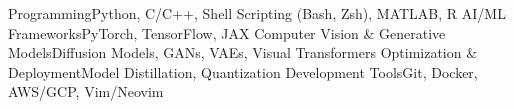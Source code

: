 
\begin{cvskills}
\cvskill
{Programming}{Python, C/C++, Shell Scripting (Bash, Zsh), MATLAB, R}
\cvskill
{AI/ML Frameworks}{PyTorch, TensorFlow, JAX}
\cvskill
{Computer Vision \& Generative Models}{Diffusion Models, GANs, VAEs, Visual Transformers}
\cvskill
{Optimization \& Deployment}{Model Distillation, Quantization}
\cvskill
{Development Tools}{Git, Docker, AWS/GCP, Vim/Neovim}
%
%
\end{cvskills}

\vspace{-0.5em}
